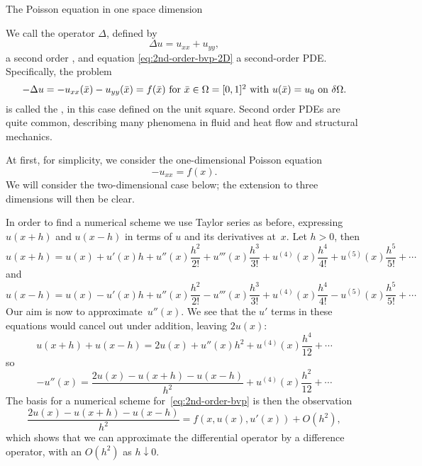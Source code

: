  {The Poisson equation in one space dimension}
\label{sec:poisson}
\label{sec:1dbvp}

We call the operator $\Delta$, defined by
\begin{equation}
  \Delta u = u_{xx}+u_{yy},
\end{equation}
a second order , and equation
\eqref{eq:2nd-order-bvp-2D} a second-order
\ac{PDE}. Specifically, the problem
\begin{equation}
 \hbox{$-\Delta u = -u_{xx}(\bar x)-u_{yy}(\bar x)=f(\bar x)$ for
   $\bar x\in\Omega=[0,1]^2$ 
    with $u(\bar x)=u_0$ on $\delta\Omega$.}
 \label{eq:2nd-order-bvp-poisson}
 \end{equation}
is called the , in this case defined on
the unit square.
Second order \acp{PDE} are quite common, describing many phenomena in
fluid and heat flow and structural mechanics.

At first, for simplicity, we consider the one-dimensional Poisson
equation
\begin{equation}
  -u_{xx}=f(x). 
\end{equation}
We will consider the two-dimensional case below; the extension to three
dimensions will then be clear.

In order to find a numerical scheme we use Taylor series as before,
expressing $u(x+h)$ and $u(x-h)$ in terms of $u$ and its derivatives
at~$x$. Let $h>0$, then
\begin{equation}
  u(x+h)=u(x)+u'(x)h+u''(x)\frac{h^2}{2!}+u'''(x)\frac{h^3}{3!}
  +u^{(4)}(x)\frac{h^4}{4!}+u^{(5)}(x)\frac{h^5}{5!}+\cdots
\end{equation}
and
\begin{equation}
  u(x-h)=u(x)-u'(x)h+u''(x)\frac{h^2}{2!}-u'''(x)\frac{h^3}{3!}
  +u^{(4)}(x)\frac{h^4}{4!}-u^{(5)}(x)\frac{h^5}{5!}+\cdots
\end{equation}
Our aim is now to approximate~$u''(x)$.
We see that the $u'$ terms in these equations would cancel out under
addition, leaving $2u(x)$:
\begin{equation}
  u(x+h)+u(x-h)=2u(x)+u''(x)h^2+u^{(4)}(x)\frac{h^4}{12}+\cdots
\end{equation}
so
\begin{equation}
 -u''(x)=\frac{2u(x)-u(x+h)-u(x-h)}{h^2}+u^{(4)}(x)\frac{h^2}{12}+\cdots
 \label{eq:2nd-order-num}
\end{equation}
The basis for a numerical scheme for~\eqref{eq:2nd-order-bvp} is then
the observation
\begin{equation}
  \frac{2u(x)-u(x+h)-u(x-h)}{h^2}=f(x,u(x),u'(x))+O(h^2),
\end{equation}
which shows that we can approximate the differential operator by a
difference operator, with an $O(h^2)$ 
as $h\downarrow0$.

